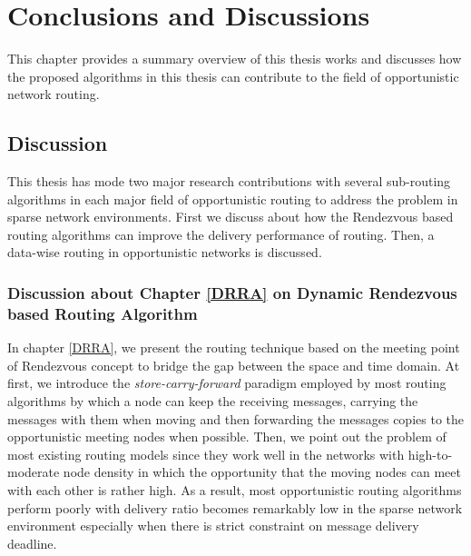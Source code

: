 \chapter{Conclusions and Discussions}
\label{cf}


This chapter provides a summary overview of this thesis works and discusses how the proposed algorithms in this thesis can contribute to the field of opportunistic network routing.

\section{Discussion}
\label{DORSI:Discussion}

This thesis has mode two major research contributions with several sub-routing algorithms in each major field of opportunistic routing to address the problem in sparse network environments.
First we discuss about how the Rendezvous based routing algorithms can improve the delivery performance of routing.
Then, a data-wise routing in opportunistic networks is discussed.

\subsection{Discussion about Chapter \ref{DRRA} on Dynamic Rendezvous based Routing Algorithm}

In chapter \ref{DRRA}, we present the routing technique based on the meeting point of Rendezvous concept to bridge the gap between the space and time domain.
At first, we introduce the \textit{store-carry-forward} paradigm employed by most routing algorithms by which a node can keep the receiving messages, carrying the messages with them when moving and then forwarding the messages copies to the opportunistic meeting nodes when possible.
Then, we point out the problem of most existing routing models since they work well in the networks with high-to-moderate node density in which the opportunity that the moving nodes can meet with each other is rather high.
As a result, most opportunistic routing algorithms perform poorly with delivery ratio becomes remarkably low in the sparse network environment especially when there is strict constraint on message delivery deadline.

